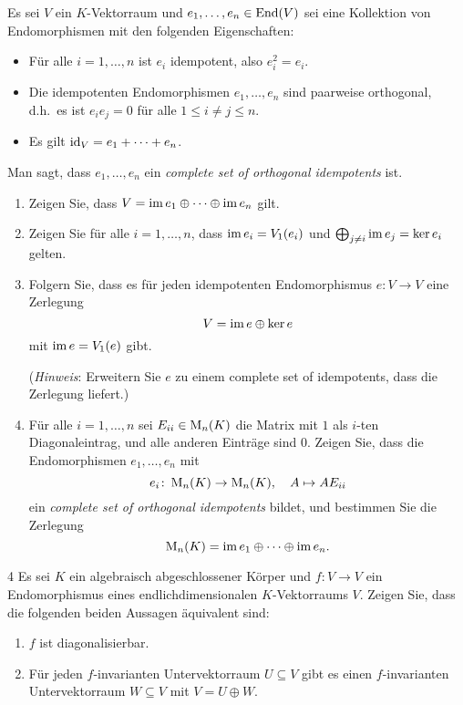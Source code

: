 \begin{question}[subtitle = Complete sets of orthogonal idempotents]{3}
  Es sei $V$ ein $K$-Vektorraum und $e_1, \dotsc, e_n \in \operatorname{End}(V)$ sei eine Kollektion von Endomorphismen mit den folgenden Eigenschaften:
  \begin{itemize}
    \item
      Für alle $i = 1, \dotsc, n$ ist $e_i$ idempotent, also $e_i^2 = e_i$.
    \item
      Die idempotenten Endomorphismen $e_1, \dotsc, e_n$ sind paarweise orthogonal, d.h.\ es ist $e_i e_j = 0$ für alle $1 \leq i \neq j \leq n$.
    \item
      Es gilt $\operatorname{id}_V = e_1 + \dotsb + e_n$.
  \end{itemize}
  Man sagt, dass $e_1, \dotsc, e_n$ ein \emph{complete set of orthogonal idempotents} ist.
  \begin{enumerate}[leftmargin=*]
    \item
      Zeigen Sie, dass $V = \operatorname{im} e_1 \oplus \dotsb \oplus \operatorname{im} e_n$ gilt.
    \item
      Zeigen Sie für alle $i = 1, \dotsc, n$, dass $\operatorname{im} e_i = V_1(e_i)$ und $\bigoplus_{j \neq i} \operatorname{im} e_j = \ker e_i$ gelten.
    \item
      Folgern Sie, dass es für jeden idempotenten Endomorphismus $e \colon V \to V$ eine Zerlegung
      \[
        V = \operatorname{im} e \oplus \ker e
      \]
      mit $\operatorname{im} e = V_1(e)$ gibt.
      
      (\emph{Hinweis}:
       Erweitern Sie $e$ zu einem complete set of idempotents, dass die Zerlegung liefert.)
    \item
      Für alle $i = 1, \dotsc, n$ sei $E_{ii} \in \operatorname{M}_n(K)$ die Matrix mit $1$ als $i$-ten Diagonaleintrag, und alle anderen Einträge sind $0$.
      Zeigen Sie, dass die Endomorphismen $e_1, \dotsc, e_n$ mit
      \[
        e_i \colon \operatorname{M}_n(K) \to \operatorname{M}_n(K),
        \quad
        A \mapsto A E_{ii}
      \]
      ein \emph{complete set of orthogonal idempotents} bildet, und bestimmen Sie die Zerlegung
      \[
        \operatorname{M}_n(K) = \operatorname{im} e_1 \oplus \dotsb \oplus \operatorname{im} e_n.
      \]
  \end{enumerate}
\end{question}







\begin{question}[subtitle = Eine Charakterisierung von Diagonalisierbarkeit über direkte Komplemente]{4}
  Es sei $K$ ein algebraisch abgeschlossener Körper und $f \colon V \to V$ ein Endomorphismus eines endlichdimensionalen $K$-Vektorraums $V$.
  Zeigen Sie, dass die folgenden beiden Aussagen äquivalent sind:
  \begin{enumerate}
    \item
      $f$ ist diagonalisierbar.
    \item
      Für jeden $f$-invarianten Untervektorraum $U \subseteq V$ gibt es einen $f$-invarianten Untervektorraum $W \subseteq V$ mit $V = U \oplus W$.
  \end{enumerate}
\end{question}


